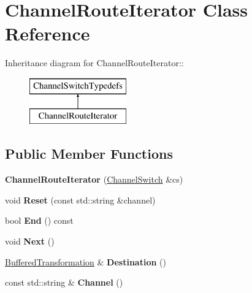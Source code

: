 \hypertarget{class_channel_route_iterator}{
\section{ChannelRouteIterator Class Reference}
\label{class_channel_route_iterator}
}
Inheritance diagram for ChannelRouteIterator::\begin{figure}[H]
\begin{center}
\leavevmode
\includegraphics[height=2cm]{class_channel_route_iterator}
\end{center}
\end{figure}
\subsection*{Public Member Functions}
\begin{DoxyCompactItemize}
\item 
\hypertarget{class_channel_route_iterator_a4004b98eb901673b791c2efde5c5d2b0}{
{\bfseries ChannelRouteIterator} (\hyperlink{class_channel_switch}{ChannelSwitch} \&cs)}
\label{class_channel_route_iterator_a4004b98eb901673b791c2efde5c5d2b0}

\item 
\hypertarget{class_channel_route_iterator_a862708d9e96fb0d6f884fb7e022a5b5a}{
void {\bfseries Reset} (const std::string \&channel)}
\label{class_channel_route_iterator_a862708d9e96fb0d6f884fb7e022a5b5a}

\item 
\hypertarget{class_channel_route_iterator_ade25d054379f16c2bc18869cf21f1e37}{
bool {\bfseries End} () const }
\label{class_channel_route_iterator_ade25d054379f16c2bc18869cf21f1e37}

\item 
\hypertarget{class_channel_route_iterator_a76ebd766280e96f582072e7a2fea3bec}{
void {\bfseries Next} ()}
\label{class_channel_route_iterator_a76ebd766280e96f582072e7a2fea3bec}

\item 
\hypertarget{class_channel_route_iterator_a914e53e723326d4e0920e5a749bfba3b}{
\hyperlink{class_buffered_transformation}{BufferedTransformation} \& {\bfseries Destination} ()}
\label{class_channel_route_iterator_a914e53e723326d4e0920e5a749bfba3b}

\item 
\hypertarget{class_channel_route_iterator_a38ac4e35ba7c936d648b3bdfc250aa93}{
const std::string \& {\bfseries Channel} ()}
\label{class_channel_route_iterator_a38ac4e35ba7c936d648b3bdfc250aa93}

\end{DoxyCompactItemize}
